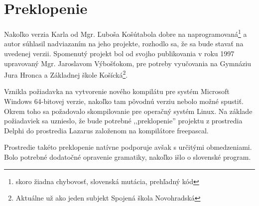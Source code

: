 


\section{Preklopenie}

Nakoľko verzia Karla od Mgr. Ľuboša Košúta\cite{KOSUT97}bola dobre na naprogramovaná\footnote{skoro žiadna chybovosť, slovenská mutácia, prehľadný kód} a autor súhlasil nadviazaním na jeho projekte, rozhodlo sa, že sa bude stavať na uvedenej verzii. 
Spomenutý projekt bol od svojho publikovania v roku 1997 upravovaný Mgr. Jaroslavom Výbošťokom, pre potreby vyučovania na Gymnáziu Jura Hronca a Základnej škole Košícká\footnote{Aktuálne už ako jeden subjekt Spojená škola Novohradská}.

Vznikla požiadavka na vytvorenie nového kompilátu pre systém Microsoft Windows 64-bitovej verzie, nakoľko tam pôvodnú verziu nebolo možné spustiť.
Okrem toho sa požadovalo skompilovanie pre operačný systém Linux.
Na základe požiadaviek sa uznieslo, že bude potrebné ,,preklopenie'' projektu z prostredia Delphi do prostredia Lazarus založenom na kompilátore freepascal.

Prostredie takéto preklopenie natívne podporuje avšak s určitými obmedzeniami.
Bolo potrebné dodatočné opravenie gramatiky, nakoľko išlo o slovenské program.


